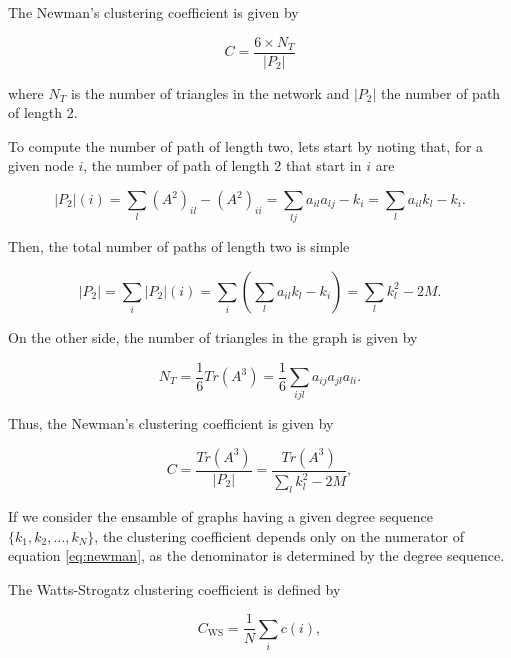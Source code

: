 \documentclass{article}
\begin{document}
The Newman's clustering coefficient is given by

\begin{equation}
    C = \dfrac{6 \times N_T}{|P_2|} 
\end{equation}

where $N_T$ is the number of triangles in the network and $|P_2|$ the number of path of length 2.

To compute the number of path of length two, lets start by noting that, for a given node $i$, the number of path of length 2 that start in $i$ are

\begin{equation}
    |P_2|(i) = \sum_{l} (A^2)_{il} - (A^2)_{ii}=  \sum_{lj} a_{il} a_{lj} - k_i = \sum_{l} a_{il} k_l - k_i.
\end{equation}

Then, the total number of paths of length two is simple 

\begin{equation} \label{eq:P2}
    |P_2| = \sum_i |P_2|(i) = \sum_i \left( \sum_{l} a_{il} k_l - k_i \right) = \sum_l k_l^2 - 2M.
\end{equation}

On the other side, the number of triangles in the graph is given by

\begin{equation} \label{eq:T}
    N_T = \dfrac{1}{6} Tr(A^3) = \dfrac{1}{6} \sum_{ijl} a_{ij} a_{jl} a_{li}.
\end{equation}

Thus, the Newman's clustering coefficient is given by

\begin{equation} \label{eq:newman}
    C = \dfrac{Tr(A^3)}{|P_2|} = \dfrac{Tr(A^3)}{\sum_l k_l^2 - 2M},
\end{equation}

If we consider the ensamble of graphs having a given degree sequence $\lbrace k_1, k_2, \dots, k_N\rbrace$, the clustering coefficient depends only on the numerator of equation \ref{eq:newman}, as the denominator is determined by the degree sequence.

The Watts-Strogatz clustering coefficient is defined by

\begin{equation} \label{eq:ws}
    C_{\mathrm{WS}} = \dfrac{1}{N} \sum_{i} c(i),
\end{equation}
\end{document}
